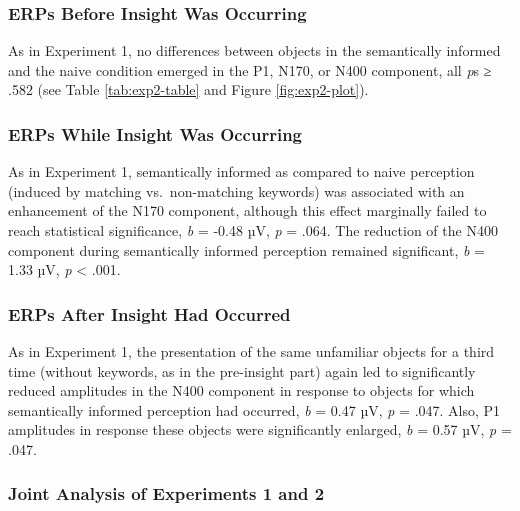 \documentclass[
  english,
  doc,12pt,twoside,floatsintext]{apa7}
\begin{document}
\hypertarget{erps-before-insight-was-occurring-1}{%
\subsubsection{ERPs Before Insight Was Occurring}\label{erps-before-insight-was-occurring-1}}

As in Experiment 1, no differences between objects in the semantically informed and the naive condition emerged in the P1, N170, or N400 component, all \emph{p}s ≥ .582 (see Table \ref{tab:exp2-table} and Figure \ref{fig:exp2-plot}).

\hypertarget{erps-while-insight-was-occurring-1}{%
\subsubsection{ERPs While Insight Was Occurring}\label{erps-while-insight-was-occurring-1}}

As in Experiment 1, semantically informed as compared to naive perception (induced by matching vs.~non-matching keywords) was associated with an enhancement of the N170 component, although this effect marginally failed to reach statistical significance, \emph{b} = -0.48 µV, \emph{p} = .064. The reduction of the N400 component during semantically informed perception remained significant, \emph{b} = 1.33 µV, \emph{p} \textless{} .001.

\hypertarget{erps-after-insight-had-occurred-1}{%
\subsubsection{ERPs After Insight Had Occurred}\label{erps-after-insight-had-occurred-1}}

As in Experiment 1, the presentation of the same unfamiliar objects for a third time (without keywords, as in the pre-insight part) again led to significantly reduced amplitudes in the N400 component in response to objects for which semantically informed perception had occurred, \emph{b} = 0.47 µV, \emph{p} = .047. Also, P1 amplitudes in response these objects were significantly enlarged, \emph{b} = 0.57 µV, \emph{p} = .047.

\hypertarget{joint-analysis-of-experiments-1-and-2}{%
\subsubsection{Joint Analysis of Experiments 1 and 2}\label{joint-analysis-of-experiments-1-and-2}}
\end{document}
